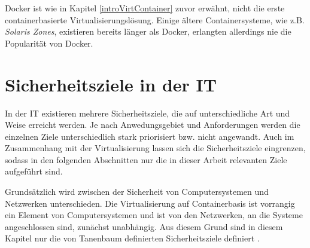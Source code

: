\documentclass[../main.tex]{subfiles}
\begin{document}

      Docker ist wie in Kapitel \ref{introVirtContainer} zuvor erwähnt, nicht die erste containerbasierte Virtualisierungslösung. Einige ältere Containersysteme, wie z.B. \emph{Solaris Zones}, existieren bereits länger als Docker, erlangten allerdings nie die Popularität von Docker.


  \section{Sicherheitsziele in der IT}
  \label{introSecGoals}
		In der IT existieren mehrere Sicherheitsziele, die auf unterschiedliche Art und Weise erreicht werden. Je nach Anwedungsgebiet und Anforderungen werden die einzelnen Ziele unterschiedlich stark priorisiert bzw. nicht angewandt. Auch im Zusammenhang mit der Virtualisierung lassen sich die Sicherheitsziele eingrenzen, sodass in den folgenden Abschnitten nur die in dieser Arbeit relevanten Ziele aufgeführt sind.

		Grundsätzlich wird zwischen der Sicherheit von Computersystemen und Netzwerken unterschieden. Die Virtualisierung auf Containerbasis ist vorrangig ein Element von Computersystemen und ist von den Netzwerken, an die Systeme angeschlossen sind, zunächst unabhängig. Aus diesem Grund sind in diesem Kapitel nur die von Tanenbaum definierten Sicherheitsziele definiert \cite[S.712f.]{tanenbaumOS}.



\end{document}
